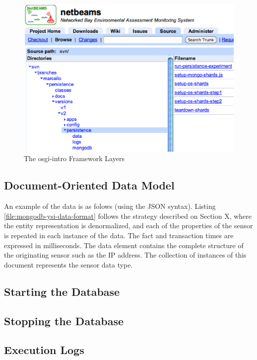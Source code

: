 \begin{figure}[!h]
  \centering
  \includegraphics[scale=0.5]{../diagrams/dsp-persistence-system-dir}
  \caption{The osgi-intro Framework Layers}
  \label{fig:dsp-persistence-system-dir}
\end{figure}

\subsection{Document-Oriented Data Model}

An example of the data is as folows (using the JSON syntax). Listing
\ref{file:mongodb-ysi-data-format} follows the strategy described on Section X,
where the entity representation is denormalized, and each of the properties of
the sensor is repeated in each instance of the data. The fact and transaction
times are expressed in milliseconds. The data element contains the complete
structure of the originating sensor such as the IP address. The collection of
instances of this document represents the sensor data type.

\subsection{Starting the Database}

\subsection{Stopping the Database}

\subsection{Execution Logs}


